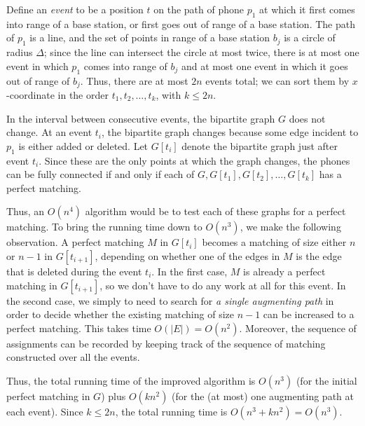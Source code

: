 \documentclass[12pt]{article}
\begin{document}
\begin{enumerate}
{Define an {\em event} to be a position $t$ on the path of phone $p_1$
at which it first comes into range of a base station,
or first goes out of range of a base station.
The path of $p_1$ is a line, and
the set of points in range of a base station
$b_j$ is a circle of radius $\Delta$;
since the line can intersect the circle at most twice,
there is at most one event in which $p_1$ comes into range of $b_j$
and at most one event in which it goes out of range of $b_j$.
Thus, there are at most $2n$ events total; we
can sort them by $x$-coordinate in the order $t_1, t_2, \ldots, t_k$,
with $k \leq 2n$.

In the interval between consecutive events,
the bipartite graph $G$ does not change.
At an event $t_i$, the bipartite graph changes because some
edge incident to $p_1$ is either added or deleted.
Let $G[t_i]$ denote the bipartite graph just after event $t_i$.
Since these are the only points at which the graph changes,
the phones can be fully connected if and only if
each of $G, G[t_1], G[t_2], \ldots, G[t_k]$ has a perfect matching.

Thus, an $O(n^4)$ algorithm would be to test each of
these graphs for a perfect matching.
To bring the running time down to $O(n^3)$, we make
the following observation.
A perfect matching $M$ in $G[t_i]$ becomes a matching
of size either $n$ or $n-1$ in $G[t_{i+1}]$,
depending on whether one of the edges in $M$
is the edge that is deleted during the event $t_i$.
In the first case, $M$ is already a perfect matching in $G[t_{i+1}]$,
so we don't have to do any work at all for this event.
In the second case, we simply to need to search for {\em a single
augmenting path} in order to decide whether the
existing matching of size $n-1$ can be increased to a perfect matching.
This takes time $O(|E|) = O(n^2)$.
Moreover, the sequence of assignments can be recorded
by keeping track of the sequence of matching constructed
over all the events.

Thus, the total running time of the improved algorithm
is $O(n^3)$ (for the initial perfect matching in $G$)
plus $O(kn^2)$ (for the (at most) one augmenting path
at each event).
Since $k \leq 2n$, the total running time is $O(n^3 + kn^2) = O(n^3)$.

}


\end{enumerate}
\end{document}
